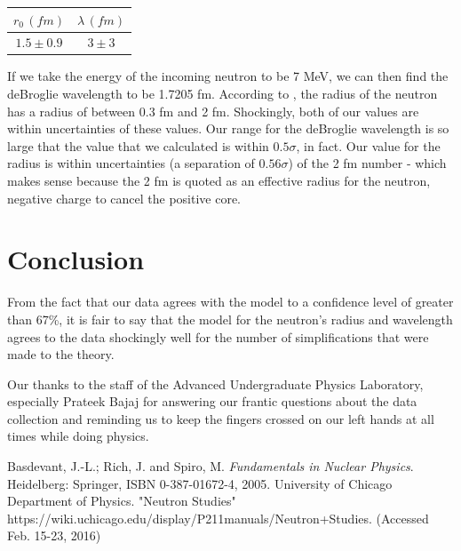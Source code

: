 \documentclass{article}
\begin{document}
  \begin{center}
    \begin{tabular}{|c|c|} \hline
      $r_0\,(fm)$ & $\lambda\,(fm)$ \\ \hline
      $1.5 \pm 0.9$ & $3 \pm 3$ \\ \hline
    \end{tabular}
  \end{center}

  If we take the energy of the incoming neutron to be 7 MeV, we can then find the deBroglie wavelength to be 1.7205 fm.  According to \cite{rad_n}, the radius of the neutron has a radius of between 0.3 fm and 2 fm.  Shockingly, both of our values are within uncertainties of these values.  Our range for the deBroglie wavelength is so large that the value that we calculated is within $0.5\sigma$, in fact.  Our value for the radius is within uncertainties (a separation of $0.56\sigma$) of the 2 fm number - which makes sense because the 2 fm is quoted as an effective radius for the neutron, negative charge to cancel the positive core.

\section{Conclusion}
  From the fact that our data agrees with the model to a confidence level of greater than 67\%, it is fair to say that the model for the neutron's radius and wavelength agrees to the data shockingly well for the number of simplifications that were made to the theory.

  \hspace{.25cm}

  Our thanks to the staff of the Advanced Undergraduate Physics Laboratory, especially Prateek Bajaj for answering our frantic questions about the data collection and reminding us to keep the fingers crossed on our left hands at all times while doing physics.

\begin{thebibliography}{2}
    Basdevant, J.-L.; Rich, J. and Spiro, M. \emph{Fundamentals in Nuclear Physics}. Heidelberg: Springer, ISBN 0-387-01672-4, 2005.
  	University of Chicago Department of Physics. "Neutron Studies"  https://wiki.uchicago.edu/display/P211manuals/Neutron+Studies. (Accessed Feb. 15-23, 2016)
\end{thebibliography}
\end{document}
